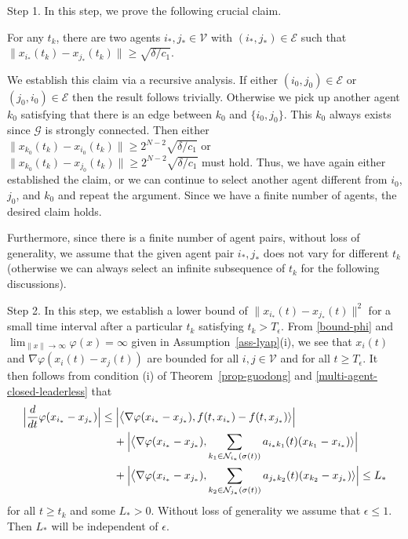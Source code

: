 \documentclass[a4paper, 11pt]{article}
\begin{document}
\vspace{2mm}

\noindent Step 1. In this step, we prove the following crucial claim.

\vspace{1mm}

 For any $t_k$, there are two agents $i_\ast, j_\ast \in\mathcal{V}$ with $(i_\ast,j_\ast)\in \mathcal{E}$ such that $\|x_{i_\ast}(t_k)-x_{j_\ast}(t_k)\|\geq \sqrt{\delta/c_1}$.

We establish this claim via a recursive analysis. If either $(i_0,j_0)\in  \mathcal{E}$ or  $(j_0,i_0)\in  \mathcal{E}$ then the result follows trivially. Otherwise we pick up another agent $k_0$ satisfying that there is an edge between $k_0$ and $\{i_0,j_0\}$. This $k_0$ always exists since $\mathcal{G}$ is strongly connected. Then either $\|x_{k_0}(t_k)-x_{i_0}(t_k)\|\geq 2^{N-2}\sqrt{\delta/c_1}$ or $\|x_{k_0}(t_k)-x_{j_0}(t_k)\|\geq 2^{N-2}\sqrt{\delta/c_1}$ must hold. Thus, we have again either established the claim, or we can continue to select another agent different from $i_0$, $j_0$, and $k_0$ and repeat the argument. Since we have a finite number of agents, the desired claim holds.

Furthermore, since there is a finite number of agent pairs, without loss of generality, we assume that the given agent pair $i_\ast,j_\ast$ does not vary for different $t_k$ (otherwise we can always select an infinite subsequence of $t_k$ for the following discussions).

\vspace{2mm}

\noindent Step 2. In this step, we establish a lower bound of $\|x_{i_\ast}(t)-x_{j_\ast}(t)\|^2$ for a small time interval after a particular $t_k$ satisfying $t_k> T_\epsilon$.
From \eqref{bound-phi} and $\lim_{\|x\| \rightarrow \infty}\varphi(x)=\infty$ given in Assumption~\ref{ass-lyap}(i),
we see that $x_i(t)$ and $\nabla \varphi(x_i(t)-x_j(t))$ are bounded for all $i, j\in\mathcal{V}$ and for all $t\geq T_\epsilon$.
It then follows from condition (i) of Theorem~\ref{prop-guodong} and \eqref{multi-agent-closed-leaderless} that
\begin{align*}
\Big|\frac{d}{dt}\varphi(x_{i_\ast}-x_{j_\ast})\Big| & \leq \Big| \big \langle \nabla \varphi(x_{i_\ast}-x_{j_\ast}), f(t,x_{i_\ast})-f(t,x_{j_\ast})\rangle\Big| \\
 &\hspace{0.4cm} +\Big| \big \langle \nabla \varphi(x_{i_\ast}-x_{j_\ast}), \sum _{k_1 \in \mathcal{N}_{i_\ast}(\sigma(t))} a_{i_\ast k_1}(t)(x_{k_1}-x_{i_\ast})\rangle\Big| \\
&\hspace{0.4cm}+\Big| \big \langle \nabla \varphi(x_{i_\ast}-x_{j_\ast}), \sum _{k_2 \in \mathcal{N}_{j_\ast}(\sigma(t))} a_{j_\ast k_2}(t)(x_{k_2}-x_{j_\ast})\rangle\Big| \leq L_\ast
\end{align*}
for all $t \geq t_k$ and some $L_\ast >0$.
Without loss of generality we assume that $\epsilon \leq 1$. Then $L_\ast$ will be independent of $\epsilon$.
\end{document}
